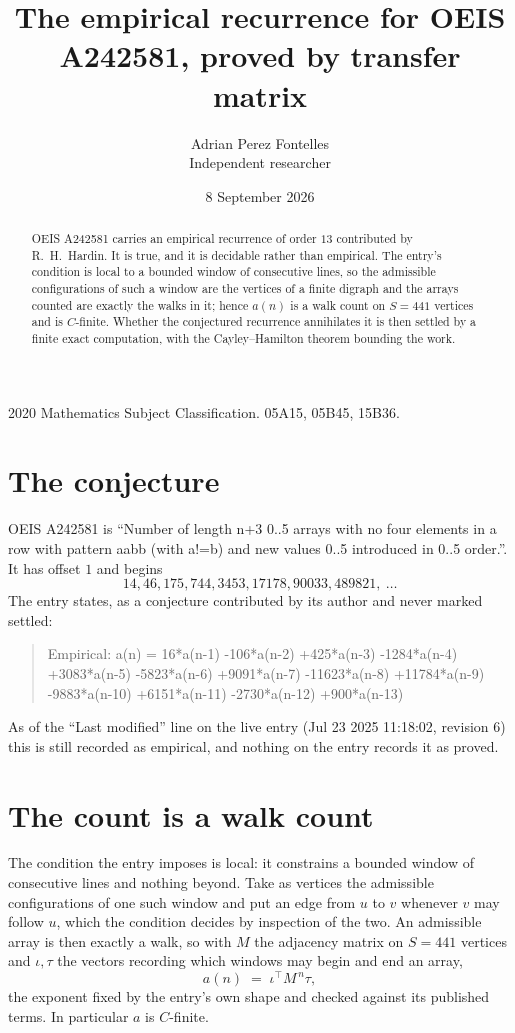 \documentclass[11pt,a4paper]{article}
\title{The empirical recurrence for OEIS A242581, proved by transfer matrix}
\author{Adrian Perez Fontelles\\ \small Independent researcher}
\date{8 September 2026}
\theoremstyle{plain}
\theoremstyle{definition}
\begin{document}
\maketitle

\begin{abstract}
OEIS A242581 carries an empirical recurrence of order $13$ contributed by R.~H.~Hardin. It is
true, and it is decidable rather than empirical. The entry's condition is local to a bounded window of consecutive lines, so
the admissible configurations of such a window are the vertices of a finite digraph and the
arrays counted are exactly the walks in it; hence $a(n)$ is a walk count on $S=441$ vertices
and is $C$-finite. Whether the conjectured recurrence annihilates it is then settled by a
finite exact computation, with the Cayley--Hamilton theorem bounding the work.
\end{abstract}

\noindent\small 2020 Mathematics Subject Classification. 05A15, 05B45, 15B36.\normalsize

\section{The conjecture}

OEIS A242581 is ``Number of length n+3 0..5 arrays with no four elements in a row with pattern aabb (with a!=b) and new values 0..5 introduced in 0..5 order.''. It has offset $1$ and begins
\[
14, 46, 175, 744, 3453, 17178, 90033, 489821,\ \dots
\]
The entry states, as a conjecture contributed by its author and never marked settled:
\begin{quote}
Empirical: a(n) = 16*a(n-1) -106*a(n-2) +425*a(n-3) -1284*a(n-4) +3083*a(n-5) -5823*a(n-6) +9091*a(n-7) -11623*a(n-8) +11784*a(n-9) -9883*a(n-10) +6151*a(n-11) -2730*a(n-12) +900*a(n-13)
\end{quote}
As of the ``Last modified'' line on the live entry (Jul 23 2025 11:18:02, revision 6) this is still
recorded as empirical, and nothing on the entry records it as proved.

\section{The count is a walk count}

The condition the entry imposes is local: it constrains a bounded window of consecutive lines and nothing beyond. Take as
vertices the admissible configurations of one such window and put an edge from $u$ to $v$
whenever $v$ may follow $u$, which the condition decides by inspection of the two. An
admissible array is then exactly a walk, so with $M$ the adjacency matrix on $S=441$ vertices
and $\iota,\tau$ the vectors recording which windows may begin and end an array,
\[
a(n)\;=\;\iota^{\!\top}M^{\,n}\tau ,
\]
the exponent fixed by the entry's own shape and checked against its published terms. In
particular $a$ is $C$-finite.
\end{document}
